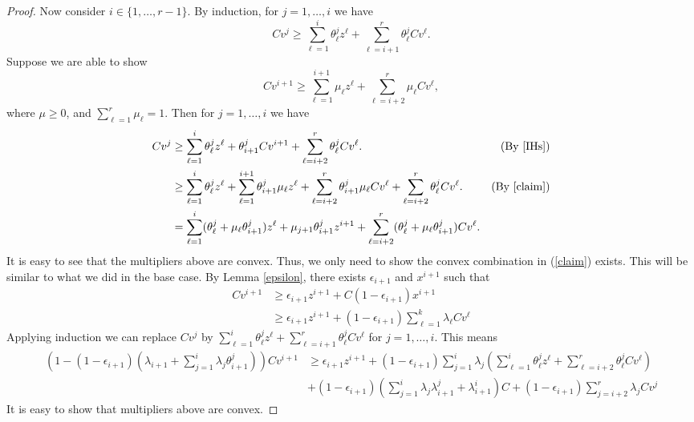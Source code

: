 \documentclass[runningheads]{llncs}
\begin{document}
\begin{proof}
{	Now consider $i\in \{1,\ldots,r-1\}$. By induction, for $j=1,\ldots,i$ we have
	\begin{equation}\label{IHs}
	Cv^j \geq  \sum_{\ell=1}^{i} \theta^{j}_\ell z^\ell + \sum_{\ell=i+1}^{r}\theta^{j}_{\ell}Cv^\ell.
	\end{equation}
	Suppose we are able to show 
	\begin{equation}\label{claim} 
	Cv^{i+1} \geq \sum_{\ell=1}^{i+1} \mu_\ell z^\ell + \sum_{\ell=i+2}^{r}\mu_{\ell}Cv^\ell,\end{equation} 
	where $\mu\geq 0$, and $\sum_{\ell=1}^{r}\mu_{\ell}=1$. Then for $j=1,\ldots,i$ we have
	\begin{align*}
		Cv^j& \geq \sum_{\ell=1}^{i} \theta^{j}_\ell z^\ell +\theta^{j}_{i+1}Cv^{i+1}+  \sum_{\ell=i+2}^{r}\theta^{j}_{\ell}Cv^\ell.& (\mbox{By } \ref{IHs})\\
		& \geq \sum_{\ell=1}^{i} \theta^{j}_\ell z^\ell +\sum_{\ell=1}^{i+1}\theta^{j}_{i+1}\mu_\ell z^\ell+ \sum_{\ell=i+2}^{r}\theta^j_{i+1}\mu_{\ell}Cv^\ell +   \sum_{\ell=i+2}^{r}\theta^{j}_{\ell}Cv^\ell.& (\mbox{By } \ref{claim})\\
		&= \sum_{\ell=1}^{i} (\theta^j_\ell+\mu_{\ell}\theta^j_{i+1}) z^\ell + \mu_{j+1}\theta^j_{i+1}z^{i+1} + \sum_{\ell=i+2}^{r} (\theta^j_\ell+\mu_\ell\theta^j_{i+1})Cv^\ell.&
	\end{align*} 
	It is easy to see that the multipliers above are convex. Thus, we only need to show the convex combination in (\ref{claim}) exists. This will be similar to what we did in the base case. By Lemma \ref{epsilon}, there exists $\epsilon_{i+1}$ and $x^{i+1}$ such that
	\begin{align*}
		Cv^{i+1}&\geq \epsilon_{i+1}z^{i+1}+ C(1-\epsilon_{i+1})x^{i+1}\\
		&\geq \epsilon_{i+1}z^{i+1}+ (1-\epsilon_{i+1})\sum_{\ell=1}^{k}\lambda_{\ell}Cv^\ell
	\end{align*}
	Applying induction we can replace $Cv^j$ by $ \sum_{\ell=1}^{i} \theta^{j}_\ell z^\ell + \sum_{\ell=i+1}^{r}\theta^{j}_{\ell}Cv^\ell$ for $j=1,\ldots,i$. 
	This means
	\begin{align*}
		(1-(1-\epsilon_{i+1})(\lambda_{i+1}+\sum_{j=1}^{i}\lambda_j\theta^j_{i+1}))Cv^{i+1}&\geq \epsilon_{i+1}z^{i+1}+(1-\epsilon_{i+1})\sum_{j=1}^{i}\lambda_j (\sum_{\ell=1}^{i}\theta^j_\ell z^\ell+ \sum_{\ell=i+2}^{r}\theta^j_\ell Cv^\ell)\\
		&+(1-\epsilon_{i+1})(\sum_{j=1}^{i}\lambda_j \lambda^j_{i+1}+\lambda^i_{i+1})C+ (1-\epsilon_{i+1})\sum_{j=i+2}^{r}\lambda_jCv^{j} 
	\end{align*}
	It is easy to show that  multipliers above are convex.}\fi
\end{proof}
\end{document}
